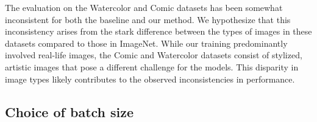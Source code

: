 The evaluation on the Watercolor and Comic datasets has been somewhat inconsistent for both the baseline and our method. We hypothesize that this inconsistency arises from the stark difference between the types of images in these datasets compared to those in ImageNet. While our training predominantly involved real-life images, the Comic and Watercolor datasets consist of stylized, artistic images that pose a different challenge for the models. This disparity in image types likely contributes to the observed inconsistencies in performance.
%
%

\subsection{Choice of batch size}
\label{section:choice_of_batch_size}

